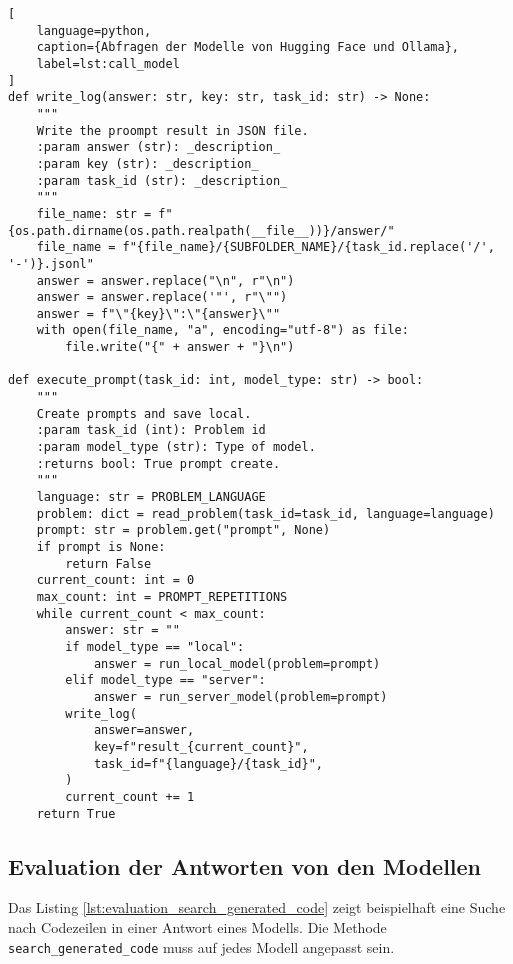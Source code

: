 \begin{lstlisting}[
	language=python,
	caption={Abfragen der Modelle von Hugging Face und Ollama},
	label=lst:call_model
]
def write_log(answer: str, key: str, task_id: str) -> None:
    """
    Write the proompt result in JSON file.
    :param answer (str): _description_
    :param key (str): _description_
    :param task_id (str): _description_
    """
    file_name: str = f"{os.path.dirname(os.path.realpath(__file__))}/answer/"
    file_name = f"{file_name}/{SUBFOLDER_NAME}/{task_id.replace('/', '-')}.jsonl"
    answer = answer.replace("\n", r"\n")
    answer = answer.replace('"', r"\"")
    answer = f"\"{key}\":\"{answer}\""
    with open(file_name, "a", encoding="utf-8") as file:
        file.write("{" + answer + "}\n")

def execute_prompt(task_id: int, model_type: str) -> bool:
    """
    Create prompts and save local.
    :param task_id (int): Problem id
    :param model_type (str): Type of model.
    :returns bool: True prompt create.
    """
    language: str = PROBLEM_LANGUAGE
    problem: dict = read_problem(task_id=task_id, language=language)
    prompt: str = problem.get("prompt", None)
    if prompt is None:
        return False
    current_count: int = 0
    max_count: int = PROMPT_REPETITIONS
    while current_count < max_count:
        answer: str = ""
        if model_type == "local":
            answer = run_local_model(problem=prompt)
        elif model_type == "server":
            answer = run_server_model(problem=prompt)
        write_log(
            answer=answer,
            key=f"result_{current_count}",
            task_id=f"{language}/{task_id}",
        )
        current_count += 1
    return True
\end{lstlisting}

\subsection{Evaluation der Antworten von den Modellen}
Das Listing \ref{lst:evaluation_search_generated_code} zeigt beispielhaft eine Suche nach Codezeilen in einer Antwort eines Modells. Die Methode \texttt{search\_generated\_code} muss auf jedes Modell angepasst sein.

